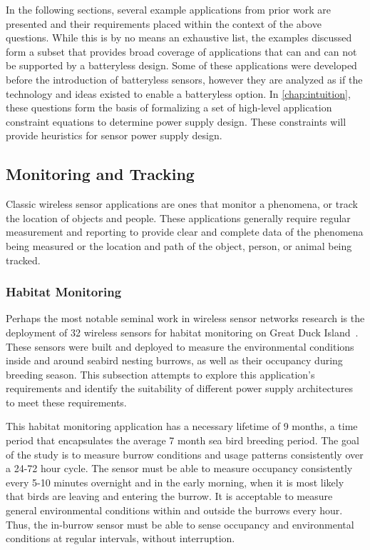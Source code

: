 \noindent In the following sections, several example applications from prior work are presented and their requirements placed within the context of the above questions. While this is by no means an exhaustive list, the examples discussed form a subset that provides broad coverage of applications that can and can not be supported by a batteryless design.
Some of these applications were developed before the introduction of batteryless sensors, however they are analyzed as if the technology and ideas existed to enable a batteryless option.
In \cref{chap:intuition}, these questions form the basis of formalizing a set of high-level application constraint equations to determine power supply design.
These constraints will provide heuristics for sensor power supply design.

\subsection{Monitoring and Tracking}
Classic wireless sensor applications are ones that monitor a phenomena, or track the location of objects and people.
These applications generally require regular measurement and reporting to provide clear and complete data of the phenomena being measured or the location and path of the object, person, or animal being tracked. 

\subsubsection{Habitat Monitoring}
Perhaps the most notable seminal work in wireless sensor networks research is the deployment of 32 wireless sensors for habitat monitoring on Great Duck Island~\cite{mainwaring2002wireless}.
These sensors were built and deployed to measure the environmental conditions inside and around seabird nesting burrows, as well as their occupancy during breeding season.
This subsection attempts to explore this application's requirements and identify the suitability of different power supply architectures to meet these requirements. 

This habitat monitoring application has a necessary lifetime of 9 months, a time period that encapsulates the average 7 month sea bird breeding period.
The goal of the study is to measure burrow conditions and usage patterns consistently over a 24-72 hour cycle. The sensor must be able to measure occupancy consistently every 5-10 minutes overnight and in the early morning, when it is most likely that birds are leaving and entering the burrow.
It is acceptable to measure general environmental conditions within and outside the burrows every hour.
Thus, the in-burrow sensor must be able to sense occupancy and environmental conditions at regular intervals, without interruption.


